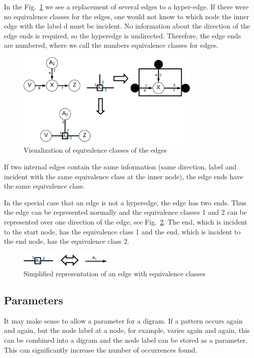 \documentclass[a4paper]{scrartcl}
\begin{document}
In the Fig.~\ref{fig:edgeEC} we see a replacement of several edges to a hyper-edge. If there were no equivalence classes for the edges, one would not know to which node the inner edge with the label d must be incident. No information about the direction of the edge ends is required, so the hyperedge is undirected. Therefore, the edge ends are numbered, where we call the numbers equivalence classes for edges.
\begin{figure}[h]
	\centering
	\includegraphics[width=0.8\textwidth]{img/edgeEC}
	\caption{Visualization of equivalence classes of the edges}
	\label{fig:edgeEC}
\end{figure}

If two internal edges contain the same information (same direction, label and incident with the same equivalence class at the inner node), the edge ends have the same equivalence class.

In the special case that an edge is not a hyperedge, the edge has two ends. Thus the edge can be represented normally and the equivalence classes 1 and 2 can be represented over one direction of the edge, see Fig.~\ref{fig:edgeECsimple}. The end, which is incident to the start node, has the equivalence class 1 and the end, which is incident to the end node, has the equivalence class 2.
\begin{figure}[h]
	\centering
	\includegraphics[width=0.4\textwidth]{img/edgeEC_simple}
	\caption{Simplified representation of an edge with equivalence classes}
	\label{fig:edgeECsimple}
\end{figure}

\subsection*{Parameters}

It may make sense to allow a parameter for a digram. If a pattern occurs again and again, but the node label at a node, for example, varies again and again, this can be combined into a digram and the node label can be stored as a parameter. This can significantly increase the number of occurrences found.
\end{document}
